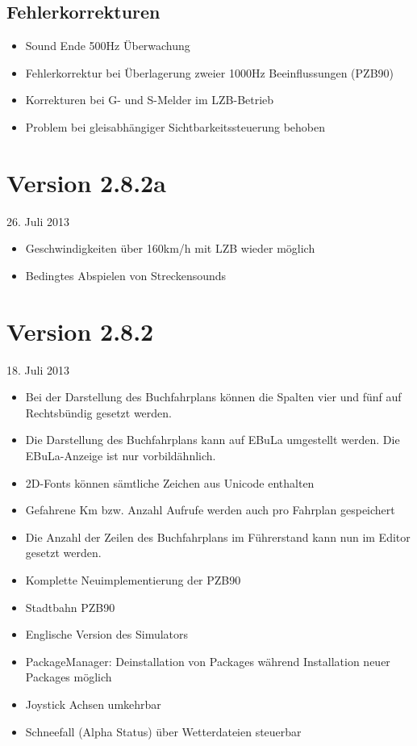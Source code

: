 \subsection{Fehlerkorrekturen}
\begin{itemize}
\item Sound Ende 500Hz Überwachung
\item Fehlerkorrektur bei Überlagerung zweier 1000Hz Beeinflussungen (PZB90)
\item Korrekturen bei G- und S-Melder im LZB-Betrieb
\item Problem bei gleisabhängiger Sichtbarkeitssteuerung behoben
\end{itemize}

\section{Version 2.8.2a}\hfill 26. Juli 2013

\begin{itemize}
\itemsep1pt\parskip0pt
\item
  Geschwindigkeiten über 160km/h mit LZB wieder möglich
\item
  Bedingtes Abspielen von Streckensounds
\end{itemize}

\section{Version 2.8.2}\hfill 18. Juli 2013

\begin{itemize}
\itemsep1pt\parskip0pt
\item
  Bei der Darstellung des Buchfahrplans können die Spalten vier und fünf
  auf Rechtsbündig gesetzt werden.
\item
  Die Darstellung des Buchfahrplans kann auf EBuLa umgestellt werden.
  Die EBuLa-Anzeige ist nur vorbildähnlich.
\item
  2D-Fonts können sämtliche Zeichen aus Unicode enthalten
\item
  Gefahrene Km bzw. Anzahl Aufrufe werden auch pro Fahrplan gespeichert
\item
  Die Anzahl der Zeilen des Buchfahrplans im Führerstand kann nun im
  Editor gesetzt werden.
 \item 
  Komplette Neuimplementierung der PZB90
\item
  Stadtbahn PZB90  
\item
  Englische Version des Simulators
\item
  PackageManager: Deinstallation von Packages während Installation neuer
  Packages möglich
\item
  Joystick Achsen umkehrbar
\item
  Schneefall (Alpha Status) über Wetterdateien steuerbar
\end{itemize}

